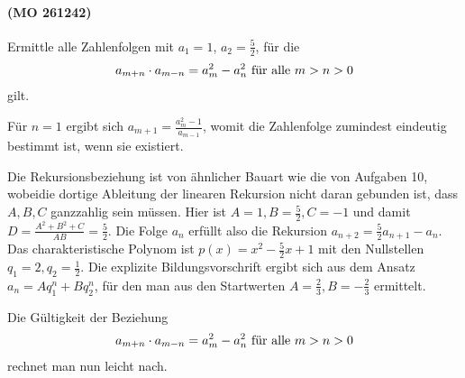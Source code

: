\documentclass[11pt,a4paper]{article}
\begin{document}
\paragraph{(MO 261242)}
Ermittle alle Zahlenfolgen mit $a_1=1$, $a_2=\frac52$, für die
\begin{gather*}
  a_{m+n}\cdot a_{m-n}=a_m^2-a_n^2\ \text{für alle}\ m>n>0
\end{gather*}
gilt.

\begin{loesung}
  Für $n=1$ ergibt sich $a_{m+1}=\frac{a_m^2-1}{a_{m-1}}$, womit die
  Zahlenfolge zumindest eindeutig bestimmt ist, wenn sie existiert.

  Die Rekursionsbeziehung ist von ähnlicher Bauart wie die von Aufgaben 10,
  wobeidie dortige Ableitung der linearen Rekursion nicht daran gebunden ist,
  dass $A,B,C$ ganzzahlig sein müssen.  Hier ist $A=1, B=\frac52, C=-1$ und
  damit $D=\frac{A^2+B^2+C}{AB}=\frac52$.  Die Folge $a_n$ erfüllt also die
  Rekursion $a_{n+2}=\frac52a_{n+1}-a_n$.  Das charakteristische Polynom ist
  $p(x)=x^2-\frac52x+1$ mit den Nullstellen $q_1=2, q_2=\frac12$.  Die
  explizite Bildungsvorschrift ergibt sich aus dem Ansatz $a_n=Aq_1^n+Bq_2^n$,
  für den man aus den Startwerten $A=\frac23, B=-\frac23$ ermittelt.

  Die Gültigkeit der Beziehung
  \begin{gather*}
    a_{m+n}\cdot a_{m-n}=a_m^2-a_n^2\ \text{für alle}\ m>n>0
  \end{gather*}
  rechnet man nun leicht nach.
\end{loesung}
\end{document}
